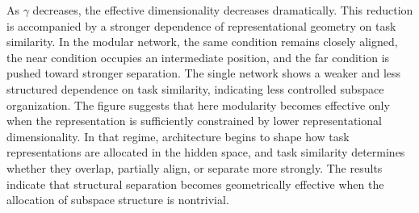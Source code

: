 \documentclass[letterpaper]{article}
\begin{document}
        
        As $\gamma$ decreases, the effective dimensionality decreases dramatically. This reduction is accompanied by a stronger dependence of representational geometry on task similarity. In the modular network, the same condition remains closely aligned, the near condition occupies an intermediate position, and the far condition is pushed toward stronger separation. The single network shows a weaker and less structured dependence on task similarity, indicating less controlled subspace organization. The figure suggests that here modularity becomes effective only when the representation is sufficiently constrained by lower representational dimensionality. In that regime, architecture begins to shape how task representations are allocated in the hidden space, and task similarity determines whether they overlap, partially align, or separate more strongly. The results indicate that structural separation becomes geometrically effective when the allocation of subspace structure is nontrivial.
\end{document}

